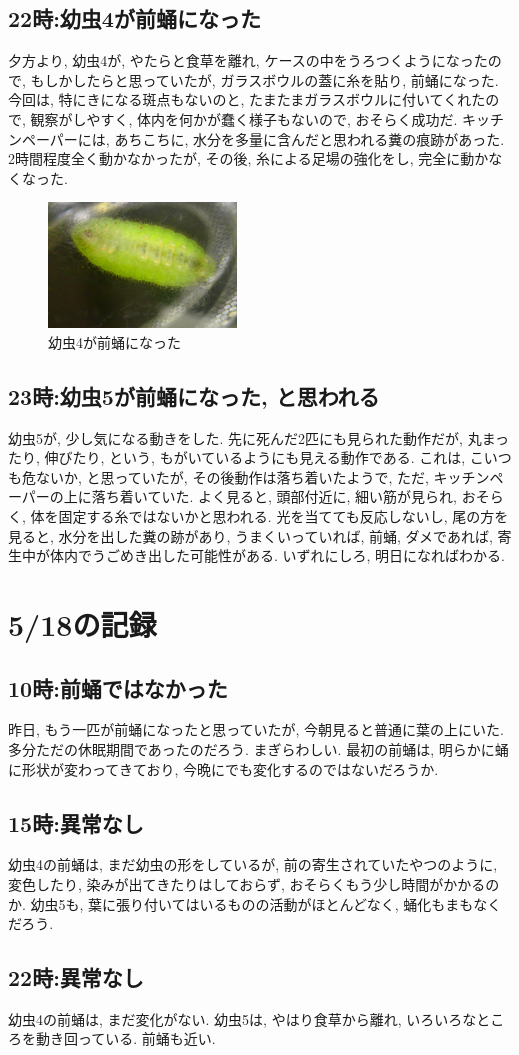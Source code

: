 \documentclass{jsarticle}
\begin{document}
\subsection{22時:幼虫4が前蛹になった}
夕方より, 幼虫4が, やたらと食草を離れ, ケースの中をうろつくようになったので, 
もしかしたらと思っていたが, ガラスボウルの蓋に糸を貼り, 前蛹になった. 
今回は, 特にきになる斑点もないのと, たまたまガラスボウルに付いてくれたので, 観察がしやすく, 
体内を何かが蠢く様子もないので, おそらく成功だ. 
キッチンペーパーには, あちこちに, 水分を多量に含んだと思われる糞の痕跡があった. 
2時間程度全く動かなかったが, その後, 糸による足場の強化をし, 完全に動かなくなった. 
\begin{figure}[htbp]
  \begin{center}
    \includegraphics[width=5cm]{photo4/prePupa.JPG}
  \end{center}
  \caption{幼虫4が前蛹になった}
\end{figure}

\subsection{23時:幼虫5が前蛹になった, と思われる}
幼虫5が, 少し気になる動きをした. 先に死んだ2匹にも見られた動作だが, 
丸まったり, 伸びたり, という, もがいているようにも見える動作である. 
これは, こいつも危ないか, と思っていたが, その後動作は落ち着いたようで, ただ, キッチンペーパーの上に落ち着いていた. 
よく見ると, 頭部付近に, 細い筋が見られ, おそらく, 体を固定する糸ではないかと思われる. 
光を当てても反応しないし, 尾の方を見ると, 水分を出した糞の跡があり, うまくいっていれば, 前蛹, 
ダメであれば, 寄生中が体内でうごめき出した可能性がある. 
いずれにしろ, 明日になればわかる. 

\section{5/18の記録}
\subsection{10時:前蛹ではなかった}
昨日, もう一匹が前蛹になったと思っていたが, 今朝見ると普通に葉の上にいた. 
多分ただの休眠期間であったのだろう. まぎらわしい. 
最初の前蛹は, 明らかに蛹に形状が変わってきており, 今晩にでも変化するのではないだろうか. 

\subsection{15時:異常なし}
幼虫4の前蛹は, まだ幼虫の形をしているが, 前の寄生されていたやつのように, 変色したり, 染みが出てきたりはしておらず, おそらくもう少し時間がかかるのか. 
幼虫5も, 葉に張り付いてはいるものの活動がほとんどなく, 蛹化もまもなくだろう. 

\subsection{22時:異常なし}
幼虫4の前蛹は, まだ変化がない. 幼虫5は, やはり食草から離れ, いろいろなところを動き回っている. 前蛹も近い. 
\end{document}
